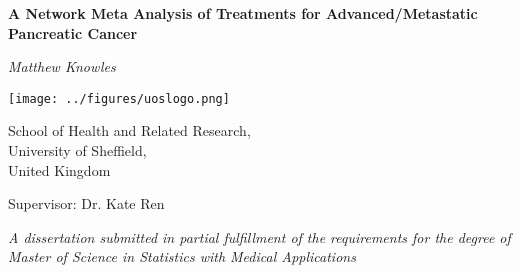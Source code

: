 \begin{titlepage}

    \begin{center}

        \vspace*{1.5cm}

        \textbf{\huge A Network Meta Analysis of Treatments for Advanced/Metastatic Pancreatic Cancer } 
        
        \vspace*{1.5cm}
        
        \textit{Matthew Knowles}

        \vspace*{1.5cm}
    
        \texttt{[image: ../figures/uoslogo.png]}
        
        \vspace*{1.5cm}
        
        School of Health and Related Research, \\
        University of Sheffield, \\
        United Kingdom \\

        \vspace*{0.5cm}

        Supervisor: Dr. Kate Ren
        
        \vspace*{1.5cm}

        \textit{A dissertation submitted in partial fulfillment of the requirements for the degree of Master of Science in 
        Statistics with Medical Applications}
    \end{center}
    
\end{titlepage}
